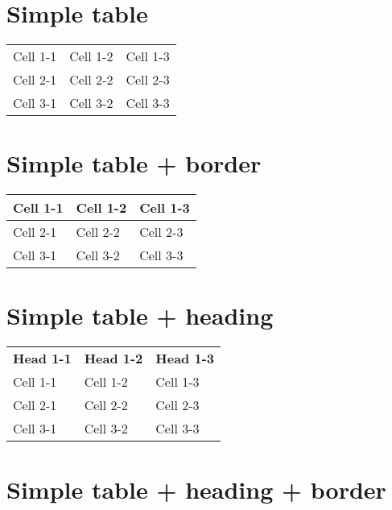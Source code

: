 \documentclass{article}
\begin{document}
\maketitle
\clearpage


\section*{Simple table}

\begin{center}\begin{tabular}{lll}
Cell 1-1 & Cell 1-2 & Cell 1-3 \\
Cell 2-1 & Cell 2-2 & Cell 2-3 \\
Cell 3-1 & Cell 3-2 & Cell 3-3 \\
\end{tabular}\end{center}

\section*{Simple table + border}

\begin{center}\begin{tabular}{|l|l|l|}
\hline Cell 1-1 & Cell 1-2 & Cell 1-3 \\
\hline Cell 2-1 & Cell 2-2 & Cell 2-3 \\
\hline Cell 3-1 & Cell 3-2 & Cell 3-3 \\
\hline \end{tabular}\end{center}

\section*{Simple table + heading}

\begin{center}\begin{tabular}{lll}
\textbf{Head 1-1} & \textbf{Head 1-2} & \textbf{Head 1-3} \\
Cell 1-1 & Cell 1-2 & Cell 1-3 \\
Cell 2-1 & Cell 2-2 & Cell 2-3 \\
Cell 3-1 & Cell 3-2 & Cell 3-3 \\
\end{tabular}\end{center}

\section*{Simple table + heading + border}
\end{document}
